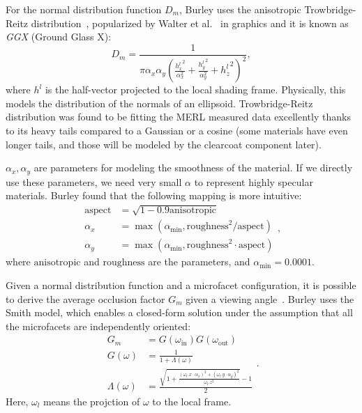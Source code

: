 For the normal distribution function $D_m$, Burley uses the anisotropic Trowbridge-Reitz distribution~\cite{Trowbridge:1975:AIR}, popularized by Walter et al.~\cite{Walter:2007:MMR} in graphics and it is known as \emph{GGX} (Ground Glass X):
\begin{equation}
D_m = \frac{1}{\pi \alpha_x \alpha_y \left(\frac{{h^l_x}^2}{\alpha_x^2} + \frac{{h^l_y}^2}{\alpha_y^2} + {h^l_z}^2\right)^2},
\end{equation}
where $h^l$ is the half-vector projected to the local shading frame. Physically, this models the distribution of the normals of an ellipsoid. Trowbridge-Reitz distribution was found to be fitting the MERL measured data excellently thanks to its heavy tails compared to a Gaussian or a cosine (some materials have even longer tails, and those will be modeled by the clearcoat component later). 

$\alpha_x, \alpha_y$ are parameters for modeling the smoothness of the material. If we directly use these parameters, we need very small $\alpha$ to represent highly specular materials. Burley found that the following mapping is more intuitive:
\begin{equation}
\begin{aligned}
\text{aspect} &= \sqrt{1 - 0.9 \text{anisotropic}} \\
\alpha_x &= \max(\alpha_{\text{min}}, \text{roughness}^2 / \text{aspect}) \\
\alpha_y &= \max(\alpha_{\text{min}}, \text{roughness}^2 \cdot \text{aspect})
\end{aligned},
\end{equation}
where $\text{anisotropic}$ and $\text{roughness}$ are the parameters, and $\alpha_{\text{min}} = 0.0001$.

Given a normal distribution function and a microfacet configuration, it is possible to derive the average occlusion factor $G_m$ given a viewing angle~\cite{Heitz:2014:UMF}. Burley uses the Smith model, which enables a closed-form solution under the assumption that all the microfacets are independently oriented:
\begin{equation}
\begin{aligned}
G_m &= G(\omega_{\text{in}}) G(\omega_{\text{out}}) \\
G(\omega) &= \frac{1}{1 + \Lambda(\omega)} \\
\Lambda(\omega) &= \frac{\sqrt{1 + \frac{\left(\omega_l.x \cdot \alpha_x\right)^2 + \left(\omega_l.y \cdot \alpha_y\right)^2}{\omega_l.z^2}} - 1}{2}
\end{aligned}.
\end{equation}
Here, $\omega_l$ means the projction of $\omega$ to the local frame.

